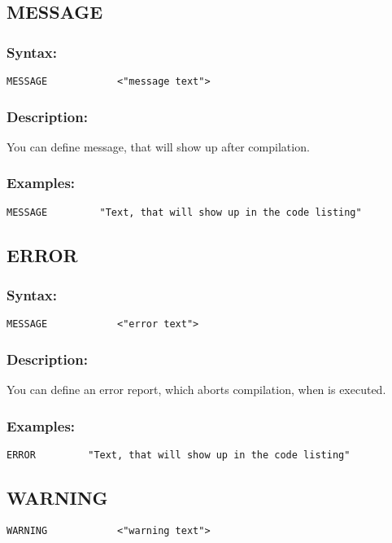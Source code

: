     \subsection{MESSAGE}
        \subsubsection{Syntax:}
            \verb'MESSAGE            <"message text">'

        \subsubsection{Description:}
            You can define message, that will show up after compilation.

        \subsubsection{Examples:}
            {
                \usecodefont
                \verb'MESSAGE         "Text, that will show up in the code listing"'
            }

    \subsection{ERROR}
        \subsubsection{Syntax:}
            \verb'MESSAGE            <"error text">'

        \subsubsection{Description:}
        You can define an error report, which aborts compilation, when is executed.

        \subsubsection{Examples:}
            {
                \usecodefont
                \verb'ERROR         "Text, that will show up in the code listing"'
            }

    \subsection{WARNING}
            \verb'WARNING            <"warning text">'

